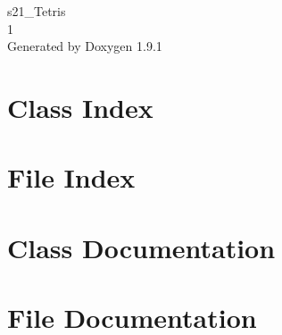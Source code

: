 \let\mypdfximage\pdfximage\def\pdfximage{\immediate\mypdfximage}\documentclass[twoside]{book}
\newcommand{\+}{\discretionary{\mbox{\scriptsize$\hookleftarrow$}}{}{}}
\newcommand{\clearemptydoublepage}{%
  \newpage{\pagestyle{empty}\cleardoublepage}%
}
\begin{document}
\raggedbottom

\hypersetup{pageanchor=false,
             bookmarksnumbered=true,
             pdfencoding=unicode
            }
\begin{titlepage}
\vspace*{7cm}
\begin{center}%
{\Large s21\+\_\+\+Tetris \\[1ex]\large 1 }\\
\vspace*{1cm}
{\large Generated by Doxygen 1.9.1}\\
\end{center}
\end{titlepage}
\clearemptydoublepage
{}
\tableofcontents
\clearemptydoublepage
{}
\hypersetup{pageanchor=true}

\chapter{Class Index}

\chapter{File Index}

\chapter{Class Documentation}






\chapter{File Documentation}







\backmatter
\newpage
{}
\clearemptydoublepage
{}
\printindex
\end{document}
